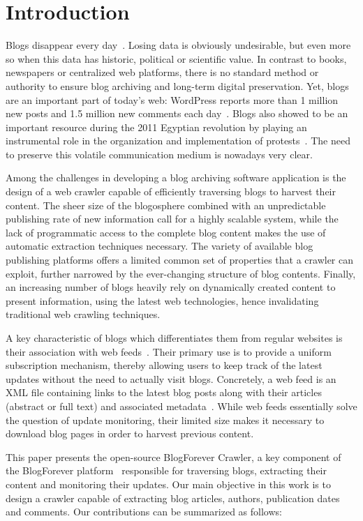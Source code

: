\section{Introduction}

Blogs disappear every day~\cite{johnson2008blogs}. Losing data is obviously undesirable, but even more so when this data has historic, political or scientific value. In contrast to books, newspapers or centralized web platforms, there is no standard method or authority to ensure blog archiving and long-term digital preservation. Yet, blogs are an important part of today's web: WordPress reports more than 1 million new posts and 1.5 million new comments each day~\cite{wordpress2014}. Blogs also showed to be an important resource during the 2011 Egyptian revolution by playing an instrumental role in the organization and implementation of protests~\cite{nahedeltantawy2012}. The need to preserve this volatile communication medium is nowadays very clear.

Among the challenges in developing a blog archiving software application is the design of a web crawler capable of efficiently traversing blogs to harvest their content. The sheer size of the blogosphere combined with an unpredictable publishing rate of new information call for a highly scalable system, while the lack of programmatic access to the complete blog content makes the use of automatic extraction techniques necessary. The variety of available blog publishing platforms offers a limited common set of properties that a crawler can exploit, further narrowed by the ever-changing structure of blog contents. Finally, an increasing number of blogs heavily rely on dynamically created content to present information, using the latest web technologies, hence invalidating traditional web crawling techniques.

A key characteristic of blogs which differentiates them from regular websites is their association with web feeds~\cite{lindahl2003weblogs}. Their primary use is to provide a uniform subscription mechanism, thereby allowing users to keep track of the latest updates without the need to actually visit blogs. Concretely, a web feed is an XML file containing links to the latest blog posts along with their articles (abstract or full text) and associated metadata~\cite{board2007rss}. While web feeds essentially solve the question of update monitoring, their limited size makes it necessary to download blog pages in order to harvest previous content.

This paper presents the open-source BlogForever Crawler, a key component of the BlogForever platform~\cite{kasioumis2013towards} responsible for traversing blogs, extracting their content and monitoring their updates. Our main objective in this work is to design a crawler capable of extracting blog articles, authors, publication dates and comments. Our contributions can be summarized as follows:

